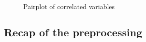 \documentclass[a4paper,11pt,dvipsnames]{article}
\begin{document}
\begin{figure}[ht]
\begin{minipage}{0.3\textwidth}
    \label{fig:pairplot_aoa_fam}
        \end{minipage}
        \caption{Pairplot of correlated variables}\label{fig:pairplot}
\end{figure}

\subsection{Recap of the preprocessing}
\end{document}
